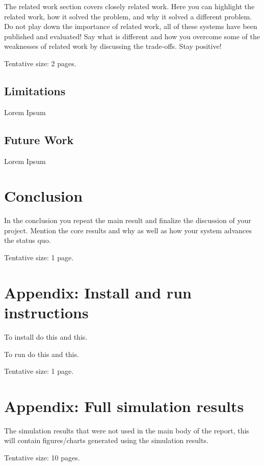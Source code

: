 \documentclass[a4paper,11pt,oneside]{report}
\begin{document}
The related work section covers closely related work. Here you can highlight
the related work, how it solved the problem, and why it solved a different
problem. Do not play down the importance of related work, all of these
systems have been published and evaluated! Say what is different and how
you overcome some of the weaknesses of related work by discussing the 
trade-offs. Stay positive!

Tentative size: 2 pages.

\section{Limitations}
Lorem Ipsum

\section{Future Work}
Lorem Ipsum

\chapter{Conclusion}

In the conclusion you repeat the main result and finalize the discussion of
your project. Mention the core results and why as well as how your system
advances the status quo.

Tentative size: 1 page.

\cleardoublepage
{}
{}
\printbibliography

\appendix
\chapter{Appendix: Install and run instructions}

To install do this and this.

To run do this and this.

Tentative size: 1 page.

\chapter{Appendix: Full simulation results}

The simulation results that were not used in the main body of the report, this
will contain figures/charts generated using the simulation results.

Tentative size: 10 pages.



\end{document}
